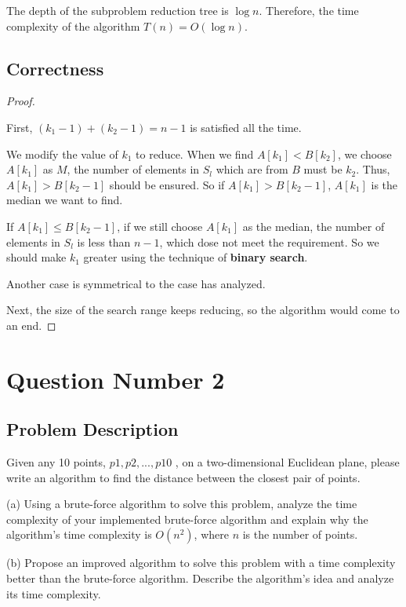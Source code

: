 \documentclass{article}
\newcommand{\bftit}[1]{\noindent\textbf{#1}}
\begin{document}
    The depth of the subproblem reduction tree is $\log{n}$. Therefore, the time complexity of the algorithm $T(n) = O(\log{n})$.

    \subsection{\bftit{Correctness}}

    \begin{proof}
        \

        First, $(k_{1} - 1) + (k_{2} - 1) = n - 1$ is satisfied all the time.

        We modify the value of $k_{1}$ to reduce. When we find $A[k_{1}] < B[k_{2}]$, we choose $A[k_{1}]$ as $M$, the number of elements in $S_{l}$ which are from $B$ must be $k_{2}$. Thus, $A[k_{1}] > B[k_{2} - 1]$ should be ensured. So if $A[k_{1}] > B[k_{2} - 1]$, $A[k_{1}]$ is the median we want to find.

        If $A[k_{1}] \le B[k_{2} - 1]$, if we still choose $A[k_{1}]$ as the median, the number of elements in $S_{l}$ is less than $n - 1$, which dose not meet the requirement. So we should make $k_{1}$ greater using the technique of \textbf{binary search}.

        Another case is symmetrical to the case has analyzed.

        Next, the size of the search range keeps reducing, so the algorithm would come to an end.
        \end{proof}
    \newpage

    \section{Question Number 2}
    \subsection{\bftit{Problem Description}}
    Given any 10 points, $p1 , p2 , ..., p10$ , on a two-dimensional Euclidean plane, please write an algorithm to find the distance between the closest pair of points.

    (a) Using a brute-force algorithm to solve this problem, analyze the time complexity of your implemented brute-force algorithm and explain why the algorithm's time complexity is $O(n^2)$, where $n$ is the number of points.

    (b) Propose an improved algorithm to solve this problem with a time complexity better than the brute-force algorithm. Describe the algorithm's idea and analyze its time complexity.
\end{document}
